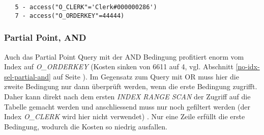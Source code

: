 \documentclass[11pt,a4paper,parskip=half]{scrartcl}
\begin{document}
\begin{lstlisting}
   5 - access("O_CLERK"='Clerk#000000286')                                                                                                                                                                                                                                                                   
   7 - access("O_ORDERKEY"=44444)   
\end{lstlisting}

\subsubsection{Partial Point, AND}
Auch das Partial Point Query mit der AND Bedingung profitiert enorm vom  Index auf \emph{O\_ORDERKEY} (Kosten sinken von 6611 auf 4, vgl. Abschnitt \ref{no-idx-sel-partial-and} auf Seite \pageref{no-idx-sel-partial-and}). Im Gegensatz zum Query mit OR muss hier die zweite Bedingung nur dann überprüft werden, wenn die erste Bedingung zugrifft. Daher kann direkt nach dem ersten \emph{INDEX RANGE SCAN} der Zugriff auf die Tabelle gemacht werden und anschliessend muss nur noch gefiltert werden (der Index \emph{O\_CLERK} wird hier nicht verwendet) . Nur eine Zeile erfüllt die erste Bedingung, wodurch die Kosten so niedrig ausfallen.
\end{document}
